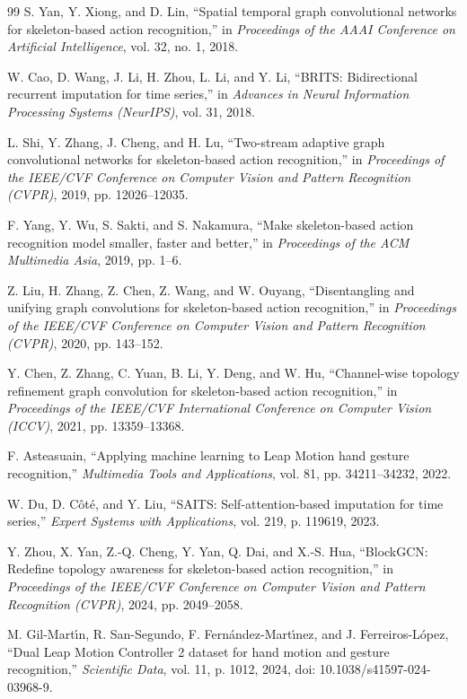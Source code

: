 \documentclass[10pt,twocolumn]{article}
\begin{document}
\begin{thebibliography}{99}
S. Yan, Y. Xiong, and D. Lin, ``Spatial temporal graph convolutional networks for skeleton-based action recognition,'' in \textit{Proceedings of the AAAI Conference on Artificial Intelligence}, vol. 32, no. 1, 2018.

W. Cao, D. Wang, J. Li, H. Zhou, L. Li, and Y. Li, ``BRITS: Bidirectional recurrent imputation for time series,'' in \textit{Advances in Neural Information Processing Systems (NeurIPS)}, vol. 31, 2018.

L. Shi, Y. Zhang, J. Cheng, and H. Lu, ``Two-stream adaptive graph convolutional networks for skeleton-based action recognition,'' in \textit{Proceedings of the IEEE/CVF Conference on Computer Vision and Pattern Recognition (CVPR)}, 2019, pp. 12026--12035.

F. Yang, Y. Wu, S. Sakti, and S. Nakamura, ``Make skeleton-based action recognition model smaller, faster and better,'' in \textit{Proceedings of the ACM Multimedia Asia}, 2019, pp. 1--6.

Z. Liu, H. Zhang, Z. Chen, Z. Wang, and W. Ouyang, ``Disentangling and unifying graph convolutions for skeleton-based action recognition,'' in \textit{Proceedings of the IEEE/CVF Conference on Computer Vision and Pattern Recognition (CVPR)}, 2020, pp. 143--152.

Y. Chen, Z. Zhang, C. Yuan, B. Li, Y. Deng, and W. Hu, ``Channel-wise topology refinement graph convolution for skeleton-based action recognition,'' in \textit{Proceedings of the IEEE/CVF International Conference on Computer Vision (ICCV)}, 2021, pp. 13359--13368.

F. Asteasuain, ``Applying machine learning to Leap Motion hand gesture recognition,'' \textit{Multimedia Tools and Applications}, vol. 81, pp. 34211--34232, 2022.

W. Du, D. C{\^o}t{\'e}, and Y. Liu, ``SAITS: Self-attention-based imputation for time series,'' \textit{Expert Systems with Applications}, vol. 219, p. 119619, 2023.

Y. Zhou, X. Yan, Z.-Q. Cheng, Y. Yan, Q. Dai, and X.-S. Hua, ``BlockGCN: Redefine topology awareness for skeleton-based action recognition,'' in \textit{Proceedings of the IEEE/CVF Conference on Computer Vision and Pattern Recognition (CVPR)}, 2024, pp. 2049--2058.

M. Gil-Mart{\'\i}n, R. San-Segundo, F. Fern{\'a}ndez-Mart{\'\i}nez, and J. Ferreiros-L{\'o}pez, ``Dual Leap Motion Controller 2 dataset for hand motion and gesture recognition,'' \textit{Scientific Data}, vol. 11, p. 1012, 2024, doi: 10.1038/s41597-024-03968-9.


\end{thebibliography}
\end{document}
